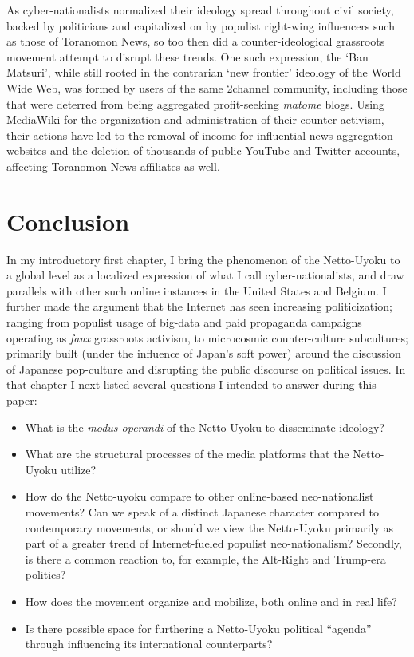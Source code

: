 \documentclass[10pt,british,A4paper,,openany]{memoir}
\providecommand{\tightlist}{%
  \setlength{\itemsep}{0pt}\setlength{\parskip}{0pt}}
\begin{document}
As cyber-nationalists normalized their ideology spread throughout civil
society, backed by politicians and capitalized on by populist right-wing
influencers such as those of Toranomon News, so too then did a
counter-ideological grassroots movement attempt to disrupt these trends.
One such expression, the `Ban Matsuri', while still rooted in the
contrarian `new frontier' ideology of the World Wide Web, was formed by
users of the same 2channel community, including those that were deterred
from being aggregated profit-seeking \emph{matome} blogs. Using
MediaWiki for the organization and administration of their
counter-activism, their actions have led to the removal of income for
influential news-aggregation websites and the deletion of thousands of
public YouTube and Twitter accounts, affecting Toranomon News affiliates
as well.

\newpage

\chapter*{Conclusion}

In my introductory first chapter, I bring the phenomenon of the
Netto-Uyoku to a global level as a localized expression of what I call
cyber-nationalists, and draw parallels with other such online instances
in the United States and Belgium. I further made the argument that the
Internet has seen increasing politicization; ranging from populist usage
of big-data and paid propaganda campaigns operating as \emph{faux}
grassroots activism, to microcosmic counter-culture subcultures;
primarily built (under the influence of Japan's soft power) around the
discussion of Japanese pop-culture and disrupting the public discourse
on political issues. In that chapter I next listed several questions I
intended to answer during this paper:

\begin{itemize}
\tightlist
\item
  What is the \emph{modus operandi} of the Netto-Uyoku to disseminate
  ideology?
\item
  What are the structural processes of the media platforms that the
  Netto-Uyoku utilize?
\item
  How do the Netto-uyoku compare to other online-based neo-nationalist
  movements? Can we speak of a distinct Japanese character compared to
  contemporary movements, or should we view the Netto-Uyoku primarily as
  part of a greater trend of Internet-fueled populist neo-nationalism?
  Secondly, is there a common reaction to, for example, the Alt-Right
  and Trump-era politics?
\item
  How does the movement organize and mobilize, both online and in real
  life?
\item
  Is there possible space for furthering a Netto-Uyoku political
  ``agenda'' through influencing its international counterparts?
\end{itemize}
\end{document}
